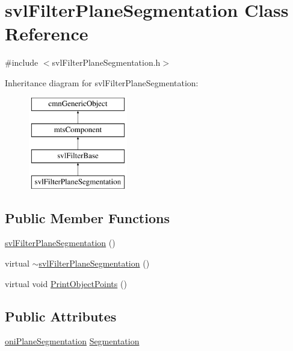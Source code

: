 \hypertarget{classsvl_filter_plane_segmentation}{\section{svl\-Filter\-Plane\-Segmentation Class Reference}
\label{classsvl_filter_plane_segmentation}
}


{\ttfamily \#include $<$svl\-Filter\-Plane\-Segmentation.\-h$>$}

Inheritance diagram for svl\-Filter\-Plane\-Segmentation\-:\begin{figure}[H]
\begin{center}
\leavevmode
\includegraphics[height=4.000000cm]{de/dc1/classsvl_filter_plane_segmentation}
\end{center}
\end{figure}
\subsection*{Public Member Functions}
\begin{DoxyCompactItemize}
\item 
\hyperlink{classsvl_filter_plane_segmentation_a8902a2dd61d39b1949c1695362f33420}{svl\-Filter\-Plane\-Segmentation} ()
\item 
virtual \hyperlink{classsvl_filter_plane_segmentation_a5c07d965e9f5b5d06511c37b5d2fa249}{$\sim$svl\-Filter\-Plane\-Segmentation} ()
\item 
virtual void \hyperlink{classsvl_filter_plane_segmentation_a0892513338b36f99cd07ee15941b644f}{Print\-Object\-Points} ()
\end{DoxyCompactItemize}
\subsection*{Public Attributes}
\begin{DoxyCompactItemize}
\item 
\hyperlink{classoni_plane_segmentation}{oni\-Plane\-Segmentation} \hyperlink{classsvl_filter_plane_segmentation_a20b68f97c3fe7cf49b3fa38d402fdb7d}{Segmentation}
\end{DoxyCompactItemize}

